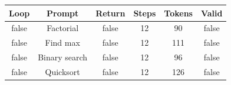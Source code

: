 \begin{table}[h]
\centering
\begin{tabular}{ |c|c|c|c|c|c| }
\hline
Loop & Prompt & Return & Steps & Tokens & Valid \\
\hline
false & Factorial & false & 12 & 90 & false \\
\hline
false & Find max & false & 12 & 111 & false \\
\hline
false & Binary search & false & 12 & 96 & false \\
\hline
false & Quicksort & false & 12 & 126 & false \\
\hline
\end{tabular}
\end{table}
